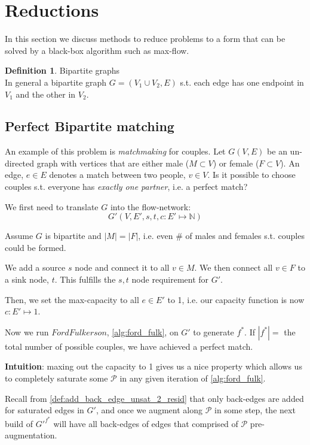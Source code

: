 \documentclass{article}
\theoremstyle{definition}
\newtheorem{definition}{Definition}[section]
\begin{document}
\section{Reductions}
In this section we discuss methods to reduce problems to a form that can be solved by a black-box algorithm such as max-flow.

\begin{definition}{Bipartite graphs}
\label{def:bipartite_graphs}
	\\In general a bipartite graph $G=(V_1 \cup V_2, E)$ s.t. each edge has one endpoint in $V_1$ and the other in $V_2$.
\end{definition}

\subsection{Perfect Bipartite matching}
An example of this problem is \textit{matchmaking} for couples. Let $G(V,E)$ be an un-directed graph with vertices that are either male ($M \subset V$) or female ($F \subset V$). An edge, $e \in E$ denotes a match between two people, $v \in V$. Is it possible to choose couples s.t. everyone has \textit{exactly one partner}, i.e. a perfect match?

We first need to translate $G$ into the flow-network: $$G'(V,E',s,t,c: E' \mapsto \mathbb{N})$$

Assume $G$ is bipartite and $|M|=|F|$, i.e. even \# of males and females s.t. couples could be formed.

We add a source $s$ node and connect it to all $v \in M$. We then connect all $v \in F$ to a sink node, $t$. This fulfills the $s,t$ node requirement for $G'$.

Then, we set the max-capacity to all $e \in E'$ to 1, i.e. our capacity function is now $c : E' \mapsto 1$.

Now we run $FordFulkerson$, \ref{alg:ford_fulk}, on $G'$ to generate $f^*$. If $|f^*| = $ the total number of possible couples, we have achieved a perfect match.

\textbf{Intuition}: maxing out the capacity to 1 gives us a nice property which allows us to completely saturate some $\mathcal{P}$ in any given iteration of \ref{alg:ford_fulk}. 

Recall from \ref{def:add_back_edge_unsat_2_resid} that only back-edges are added for saturated edges in $G'$, and once we augment along $\mathcal{P}$ in some step, the next build of ${G'}^{f^*}$ will have all back-edges of edges that comprised of $\mathcal{P}$ pre-augmentation. 
\end{document}
